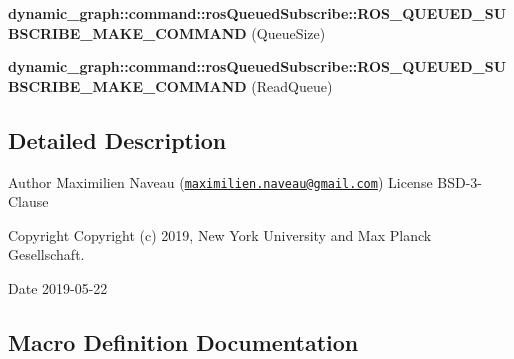 \begin{DoxyCompactItemize}
\item 
{\bfseries dynamic\+\_\+graph\+::command\+::ros\+Queued\+Subscribe\+::\+R\+O\+S\+\_\+\+Q\+U\+E\+U\+E\+D\+\_\+\+S\+U\+B\+S\+C\+R\+I\+B\+E\+\_\+\+M\+A\+K\+E\+\_\+\+C\+O\+M\+M\+A\+ND} (Queue\+Size)\hypertarget{ros__queued__subscribe_8hh_a63b0f2aac37b808005de5acf0938a07c}{}\label{ros__queued__subscribe_8hh_a63b0f2aac37b808005de5acf0938a07c}

\item 
{\bfseries dynamic\+\_\+graph\+::command\+::ros\+Queued\+Subscribe\+::\+R\+O\+S\+\_\+\+Q\+U\+E\+U\+E\+D\+\_\+\+S\+U\+B\+S\+C\+R\+I\+B\+E\+\_\+\+M\+A\+K\+E\+\_\+\+C\+O\+M\+M\+A\+ND} (Read\+Queue)\hypertarget{ros__queued__subscribe_8hh_a08be185dee34f55b3b9fff2c289b1c3d}{}\label{ros__queued__subscribe_8hh_a08be185dee34f55b3b9fff2c289b1c3d}

\end{DoxyCompactItemize}


\subsection{Detailed Description}
\begin{DoxyAuthor}{Author}
Maximilien Naveau (\href{mailto:maximilien.naveau@gmail.com}{\tt maximilien.\+naveau@gmail.\+com})  License B\+S\+D-\/3-\/\+Clause 
\end{DoxyAuthor}
\begin{DoxyCopyright}{Copyright}
Copyright (c) 2019, New York University and Max Planck Gesellschaft. 
\end{DoxyCopyright}
\begin{DoxyDate}{Date}
2019-\/05-\/22 
\end{DoxyDate}


\subsection{Macro Definition Documentation}
